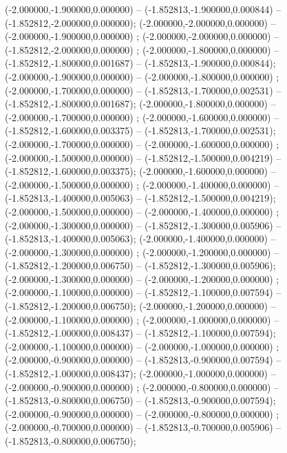  (-2.000000,-1.900000,0.000000) -- (-1.852813,-1.900000,0.000844) -- (-1.852812,-2.000000,0.000000);
 (-2.000000,-2.000000,0.000000) -- (-2.000000,-1.900000,0.000000) ;
 (-2.000000,-2.000000,0.000000) -- (-1.852812,-2.000000,0.000000) ;
 (-2.000000,-1.800000,0.000000) -- (-1.852812,-1.800000,0.001687) -- (-1.852813,-1.900000,0.000844);
 (-2.000000,-1.900000,0.000000) -- (-2.000000,-1.800000,0.000000) ;
 (-2.000000,-1.700000,0.000000) -- (-1.852813,-1.700000,0.002531) -- (-1.852812,-1.800000,0.001687);
 (-2.000000,-1.800000,0.000000) -- (-2.000000,-1.700000,0.000000) ;
 (-2.000000,-1.600000,0.000000) -- (-1.852812,-1.600000,0.003375) -- (-1.852813,-1.700000,0.002531);
 (-2.000000,-1.700000,0.000000) -- (-2.000000,-1.600000,0.000000) ;
 (-2.000000,-1.500000,0.000000) -- (-1.852812,-1.500000,0.004219) -- (-1.852812,-1.600000,0.003375);
 (-2.000000,-1.600000,0.000000) -- (-2.000000,-1.500000,0.000000) ;
 (-2.000000,-1.400000,0.000000) -- (-1.852813,-1.400000,0.005063) -- (-1.852812,-1.500000,0.004219);
 (-2.000000,-1.500000,0.000000) -- (-2.000000,-1.400000,0.000000) ;
 (-2.000000,-1.300000,0.000000) -- (-1.852812,-1.300000,0.005906) -- (-1.852813,-1.400000,0.005063);
 (-2.000000,-1.400000,0.000000) -- (-2.000000,-1.300000,0.000000) ;
 (-2.000000,-1.200000,0.000000) -- (-1.852812,-1.200000,0.006750) -- (-1.852812,-1.300000,0.005906);
 (-2.000000,-1.300000,0.000000) -- (-2.000000,-1.200000,0.000000) ;
 (-2.000000,-1.100000,0.000000) -- (-1.852812,-1.100000,0.007594) -- (-1.852812,-1.200000,0.006750);
 (-2.000000,-1.200000,0.000000) -- (-2.000000,-1.100000,0.000000) ;
 (-2.000000,-1.000000,0.000000) -- (-1.852812,-1.000000,0.008437) -- (-1.852812,-1.100000,0.007594);
 (-2.000000,-1.100000,0.000000) -- (-2.000000,-1.000000,0.000000) ;
 (-2.000000,-0.900000,0.000000) -- (-1.852813,-0.900000,0.007594) -- (-1.852812,-1.000000,0.008437);
 (-2.000000,-1.000000,0.000000) -- (-2.000000,-0.900000,0.000000) ;
 (-2.000000,-0.800000,0.000000) -- (-1.852813,-0.800000,0.006750) -- (-1.852813,-0.900000,0.007594);
 (-2.000000,-0.900000,0.000000) -- (-2.000000,-0.800000,0.000000) ;
 (-2.000000,-0.700000,0.000000) -- (-1.852813,-0.700000,0.005906) -- (-1.852813,-0.800000,0.006750);

